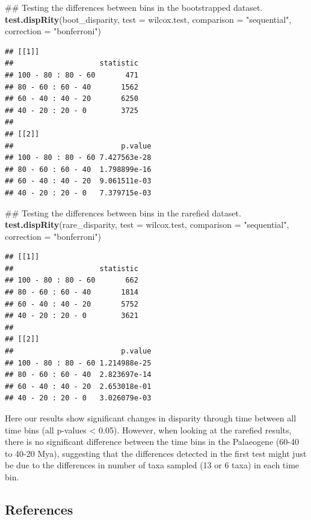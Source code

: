 \documentclass[]{book}
\newenvironment{Shaded}{\begin{snugshade}}{\end{snugshade}}
\newcommand{\KeywordTok}[1]{\textcolor[rgb]{0.13,0.29,0.53}{\textbf{#1}}}
\newcommand{\DataTypeTok}[1]{\textcolor[rgb]{0.13,0.29,0.53}{#1}}
\newcommand{\StringTok}[1]{\textcolor[rgb]{0.31,0.60,0.02}{#1}}
\newcommand{\NormalTok}[1]{#1}
\theoremstyle{definition}
\theoremstyle{definition}
\theoremstyle{remark}
\begin{document}
\begin{Shaded}
\begin{Highlighting}[]
\NormalTok{## Testing the differences between bins in the bootstrapped dataset.}
\KeywordTok{test.dispRity}\NormalTok{(boot_disparity, }\DataTypeTok{test =}\NormalTok{ wilcox.test, }\DataTypeTok{comparison =} \StringTok{"sequential"}\NormalTok{,}
    \DataTypeTok{correction =} \StringTok{"bonferroni"}\NormalTok{)}
\end{Highlighting}
\end{Shaded}

\begin{verbatim}
## [[1]]
##                    statistic
## 100 - 80 : 80 - 60       471
## 80 - 60 : 60 - 40       1562
## 60 - 40 : 40 - 20       6250
## 40 - 20 : 20 - 0        3725
## 
## [[2]]
##                         p.value
## 100 - 80 : 80 - 60 7.427563e-28
## 80 - 60 : 60 - 40  1.798899e-16
## 60 - 40 : 40 - 20  9.061511e-03
## 40 - 20 : 20 - 0   7.379715e-03
\end{verbatim}

\begin{Shaded}
\begin{Highlighting}[]
\NormalTok{## Testing the differences between bins in the rarefied dataset.}
\KeywordTok{test.dispRity}\NormalTok{(rare_disparity, }\DataTypeTok{test =}\NormalTok{ wilcox.test, }\DataTypeTok{comparison =} \StringTok{"sequential"}\NormalTok{,}
    \DataTypeTok{correction =} \StringTok{"bonferroni"}\NormalTok{)}
\end{Highlighting}
\end{Shaded}

\begin{verbatim}
## [[1]]
##                    statistic
## 100 - 80 : 80 - 60       662
## 80 - 60 : 60 - 40       1814
## 60 - 40 : 40 - 20       5752
## 40 - 20 : 20 - 0        3621
## 
## [[2]]
##                         p.value
## 100 - 80 : 80 - 60 1.214988e-25
## 80 - 60 : 60 - 40  2.823697e-14
## 60 - 40 : 40 - 20  2.653018e-01
## 40 - 20 : 20 - 0   3.026079e-03
\end{verbatim}

Here our results show significant changes in disparity through time
between all time bins (all p-values \textless{} 0.05). However, when
looking at the rarefied results, there is no significant difference
between the time bins in the Palaeogene (60-40 to 40-20 Mya), suggesting
that the differences detected in the first test might just be due to the
differences in number of taxa sampled (13 or 6 taxa) in each time bin.

\subsection{References}\label{references}
\end{document}
